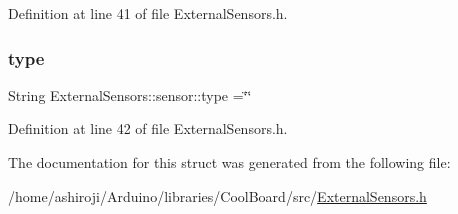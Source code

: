Definition at line 41 of file External\+Sensors.\+h.

\mbox{\label{struct_external_sensors_1_1sensor_a6acfdb02c742c2110d7bd2b5d9fce9e7}} 
\subsubsection{\texorpdfstring{type}{type}}
{\footnotesize\ttfamily String External\+Sensors\+::sensor\+::type =\char`\"{}\char`\"{}}



Definition at line 42 of file External\+Sensors.\+h.



The documentation for this struct was generated from the following file\+:\begin{DoxyCompactItemize}
\item 
/home/ashiroji/\+Arduino/libraries/\+Cool\+Board/src/\hyperlink{_external_sensors_8h}{External\+Sensors.\+h}\end{DoxyCompactItemize}
